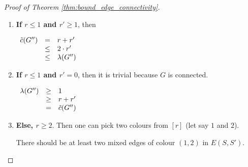 \begin{proof}[Proof of Theorem \ref{thm:bound_edge_connectivity}]
\begin{enumerate}
            \begin{enumerate}
                \item 
                    \textbf{If $r \leq 1$ and $r' \geq 1$}, then 
                    
                    \begin{center}
                        $\begin{array}{l c l}
                            \Tilde{c}(G'')  & =    & r + r' \\
                                            & \leq & 2 \cdot r' \\
                                            & \leq & \lambda(G'')
                        \end{array}$
                    \end{center}
                    
                \item 
                    \textbf{If $r \leq 1$ and $r' = 0$}, then it is trivial because $G$ is connected.
                    
                    \begin{center}
                        $\begin{array}{lcl}
                            \lambda(G'')  & \geq & 1 \\
                                          & \geq & r + r' \\
                                          & =    & \Tilde{c}(G'')
                        \end{array}$
                    \end{center}
                    
                \item
                    \textbf{Else, $r \geq 2$}.
                    Then one can pick two colours from $[r]$ (let say $1$ and $2$).
                    
                    \begin{claim}
                        \label{claim:two-mixed-edges}
                        There should be at least two mixed edges of colour $(1, 2)$ in $E(S, S')$.
                    \end{claim}
                    

\end{enumerate}
\end{enumerate}
\end{proof}
